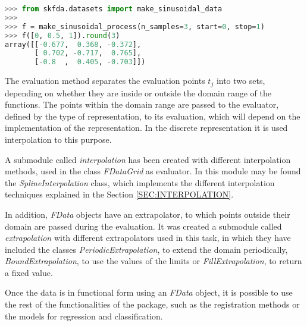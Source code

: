 \lstset{frame=lines}

\begin{lstlisting}[language=Python]
>>> from skfda.datasets import make_sinusoidal_data
>>>
>>> f = make_sinusoidal_process(n_samples=3, start=0, stop=1)
>>> f([0, 0.5, 1]).round(3)
array([[-0.677,  0.368, -0.372],
       [ 0.702, -0.717,  0.765],
       [-0.8  ,  0.405, -0.703]])
\end{lstlisting}



The evaluation method separates the evaluation points $t_j$ into two sets, depending on
whether they are inside or outside the domain range of the functions. The points
within the domain range are passed to the evaluator, defined by the type of representation,  to its evaluation,
which will depend  on the implementation of the representation. In the discrete
representation it is used interpolation to this purpose.

A submodule called \textit{interpolation} has been created with different
interpolation methods, used in the class \textit{FDataGrid} as evaluator.
In this module may be found the \textit{SplineInterpolation} class,
which implements the different interpolation techniques explained in the
Section \ref{SEC:INTERPOLATION}.

In addition, \textit{FData} objects have an extrapolator, to which
points outside their domain are passed during the evaluation. It was created
a submodule called \textit{extrapolation} with different extrapolators used in
this task,
in which they have included the classes \textit{PeriodicExtrapolation}, to
extend the domain periodically, \textit{BoundExtrapolation}, to use the
values of the limits or \textit{FillExtrapolation}, to return a fixed value.

Once the data is in functional form using an \textit{FData} object,
it is possible to use the rest of the functionalities of the package, such as
the registration methods or the models for regression and classification.
